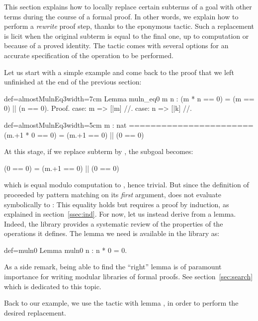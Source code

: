 This section explains how to locally replace certain
subterms of a goal with other terms during the course of a formal
proof. In other words, we explain how to perform a
\emph{rewrite} proof step, thanks to the eponymous  tactic.
Such a replacement is licit when the original subterm is equal
to the final one, up to computation or because of a proved
identity. The  tactic comes with several options for
an accurate specification of the operation to be performed.

Let us start with a simple example and come back to the proof that we
left unfinished at the end of the previous section:

\begin{coq}{def=almostMulnEq3}{width=7cm}
Lemma muln_eq0 m n :
  (m * n == 0) = (m == 0) || (n == 0).
Proof.
case: m => [|m] //.
case: n => [|k] //.
\end{coq}
\begin{coqout}{def=almostMulnEq3}{width=5cm}
m : nat
=======================
(m.+1 * 0 == 0) =
  (m.+1 == 0) || (0 == 0)
\end{coqout}
At this stage, if we replace subterm  by , the
subgoal becomes:

\begin{coqout}{}{}
(0 == 0) = (m.+1 == 0) || (0 == 0)
\end{coqout}
which is equal modulo computation to , hence trivial.
But since
the definition of  proceeded by pattern matching on its \emph{first}
argument,  does not evaluate symbolically to : This
equality holds but requires a proof by induction, as explained in
section~\ref{ssec:ind}.
For now, let us instead derive  from a lemma.
Indeed, the \mcbMC{} library provides a systematic review of the
properties of the operations it defines. The lemma we need is
available in the library as:

\begin{coq}{def=muln0}{}
Lemma muln0 n : n * 0 = 0.
\end{coq}

As a side remark, being able to find the ``right'' lemma is of
paramount importance for writing modular libraries of formal
proofs. See section~\ref{sec:search} which is dedicated to this topic.

Back to our example, we use the  tactic with lemma
, in order to perform the desired replacement.

